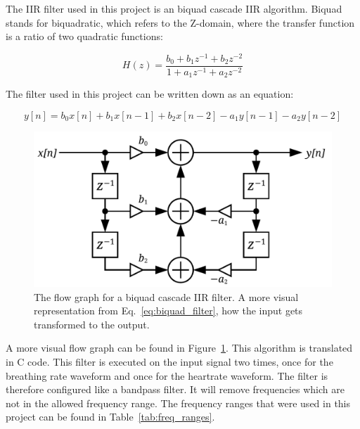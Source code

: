The IIR filter used in this project is an biquad cascade IIR algorithm. Biquad stands for biquadratic, which refers to the Z-domain, where the transfer function is a ratio of two quadratic functions:

\begin{equation}
\label{eq:biquad_filter_z}
    H(z)={\frac {b_{0}+b_{1}z^{-1}+b_{2}z^{-2}}{1+a_{1}z^{-1}+a_{2}z^{-2}}}
\end{equation}

The filter used in this project can be written down as an equation:

\begin{equation}
\label{eq:biquad_filter}
    y[n]=b_{0}x[n]+b_{1}x[n-1]+b_{2}x[n-2]-a_{1}y[n-1]-a_{2}y[n-2]
\end{equation}

\begin{figure}[t]
\centering
\includegraphics[width=.95\textwidth]{figures/measuring_vital_signs/Biquad_filter_DF-I.pdf}
\caption{The flow graph for a biquad cascade IIR filter. A more visual representation from Eq.~\ref{eq:biquad_filter}, how the input gets transformed to the output.}
\label{fig:iir_visual}
\end{figure}

A more visual flow graph can be found in Figure~\ref{fig:iir_visual}. This algorithm is translated in C code. This filter is executed on the input signal two times, once for the breathing rate waveform and once for the heartrate waveform. The filter is therefore configured like a bandpass filter. It will remove frequencies which are not in the allowed frequency range. The frequency ranges that were used in this project can be found in Table~\ref{tab:freq_ranges}.


